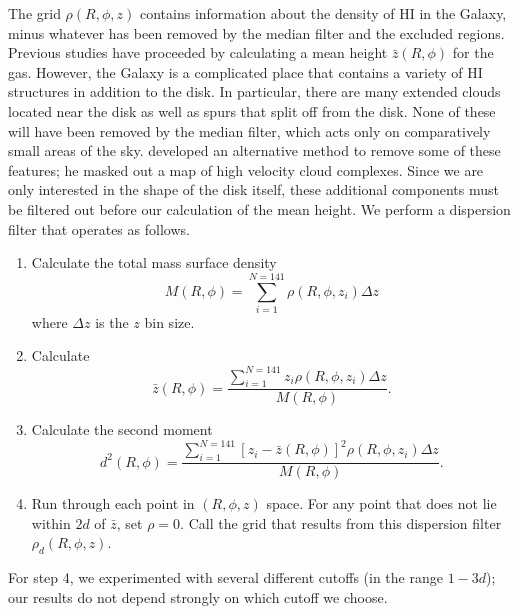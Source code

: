\documentclass[apj]{emulateapj}
\begin{document}
The grid $\rho(R,\phi,z)$ contains information about the density of HI in the Galaxy, minus whatever has been removed by the median filter and the excluded regions. Previous studies have proceeded by calculating a mean height $\bar{z}(R,\phi)$ for the gas. However, the Galaxy is a complicated place that contains a variety of HI structures in addition to  the disk. In particular, there are many extended clouds located near the disk as well as spurs that split off from the disk. None of these will have been removed by the median filter, which acts only on comparatively small areas of the sky. \citet{V1999} developed an alternative method to remove some of these features; he masked out a map of high velocity cloud complexes. 
Since we are only interested in the shape of the disk itself, these additional  components must be filtered out before  our calculation of the mean height. We perform a dispersion filter that operates as follows.
\begin{enumerate}
\item Calculate the total mass surface density\begin{equation}M(R,\phi)=\sum_{i=1}^{N=141} \rho(R,\phi,z_i)\Delta z\end{equation}
where $\Delta z$ is the $z$ bin size.
\item Calculate \begin{equation}\bar{z}(R,\phi)=\frac{\sum_{i=1}^{N=141} z_i \rho(R,\phi,z_i) \Delta z}{M(R,\phi)}.\end{equation}
\item Calculate the second moment\begin{equation}d^2(R,\phi)=\frac{\sum_{i=1}^{N=141}[z_i-\bar{z}(R,\phi)]^2 \rho(R,\phi,z_i) \Delta z}{M(R,\phi)}.\end{equation}
\item Run through each point in $(R,\phi,z)$ space.
For any point that does not lie within $2d$ of $\bar{z}$, set $\rho = 0$. Call the grid that results from this dispersion filter $\rho_d(R,\phi,z)$.
\end{enumerate}
For step 4, we experimented with several different cutoffs (in the range $1-3d$); our results do not depend strongly on which cutoff we choose.
\end{document}
